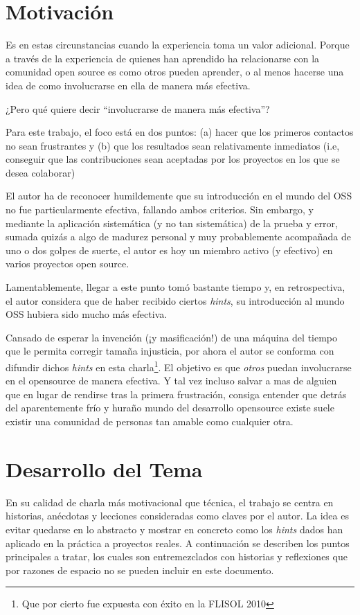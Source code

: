 \section*{Motivación}

Es en estas circunstancias cuando la experiencia toma un valor adicional. Porque
a través de la experiencia de quienes han aprendido ha relacionarse con la
comunidad open source es como otros pueden aprender, o al menos hacerse una idea
de como involucrarse en ella de manera más efectiva.

¿Pero qué quiere decir ``involucrarse de manera más efectiva''?

Para este trabajo, el foco está en dos puntos: (a) hacer que los primeros
contactos no sean frustrantes y (b) que los resultados sean relativamente
inmediatos (i.e, conseguir que las contribuciones sean aceptadas por los
proyectos en los que se desea colaborar)

El autor ha de reconocer humildemente que su introducción en el mundo del OSS no
fue particularmente efectiva, fallando ambos criterios. Sin embargo, y mediante
la aplicación sistemática (y no tan sistemática) de la prueba y error, sumada
quizás a algo de madurez personal y muy probablemente acompañada de uno o dos
golpes de suerte, el autor es hoy un miembro activo (y efectivo) en varios
proyectos open source.

Lamentablemente, llegar a este punto tomó bastante tiempo y, en
retrospectiva, el autor considera que de haber recibido ciertos \emph{hints}, su
introducción al mundo OSS hubiera sido mucho más efectiva. 

Cansado de esperar la invención (¡y masificación!) de una máquina del tiempo que
le permita corregir tamaña injusticia, por ahora el autor se conforma con
difundir dichos \emph{hints} en esta charla\footnote{Que por cierto fue expuesta
  con éxito en la FLISOL 2010}. El objetivo es que \emph{otros} puedan
involucrarse en el opensource de manera efectiva. Y tal vez incluso salvar a mas
de alguien que en lugar de rendirse tras la primera frustración, consiga
entender que detrás del aparentemente frío y huraño mundo del desarrollo
opensource existe suele existir una comunidad de personas tan amable como
cualquier otra.

\section*{Desarrollo del Tema}

En su calidad de charla más motivacional que técnica, el trabajo se centra en
historias, anécdotas y lecciones consideradas como claves por el autor. La idea
es evitar quedarse en lo abstracto y mostrar en concreto como los \emph{hints}
dados han aplicado en la práctica a proyectos reales. A continuación se
describen los puntos principales a tratar, los cuales son entremezclados con
historias y reflexiones que por razones de espacio no se pueden incluir en este
documento.

